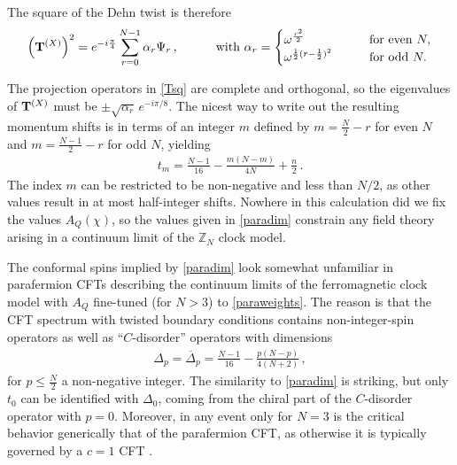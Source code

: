 The square of the Dehn twist is therefore
\begin{align} 
\Big({\mathbf{T}}^{(X)}\Big)^2 = e^{-i\frac\pi4} \sum_{r=0}^{N-1} \alpha_r \Psi_r  \,,\qquad\quad\hbox{with }\alpha_r = 
\begin{cases}
\omega^{\frac{r^2}{2}}\qquad&\hbox{for even }N,\\
\omega^{\frac12 (r-\frac12)^2}\qquad&\hbox{for odd }N.
\end{cases}
\label{Tsq}
\end{align}

The projection operators in \eqref{Tsq} are complete and orthogonal, so the eigenvalues of ${\mathbf{T}}^{(X)}$ must be
$\pm\sqrt{\alpha_r}\,e^{-i\pi/8}$. The nicest way to write out the resulting momentum shifts is in terms of an integer $m$ defined by $m = \tfrac{N}{2}-r$ for even $N$ and $m=\tfrac{N-1}{2}-r$ for odd $N$, yielding
\begin{align}
t_m=  \frac{N-1}{16} -\frac{m(N-m)}{4N} + \frac{n}{2} \,.
\label{paradim}
\end{align}
The index $m$ can be restricted to be non-negative and less than $N/2$, as other values result in at most half-integer shifts. Nowhere in this calculation did we fix the values $A_Q(\chi)$, so the values given in \eqref{paradim} constrain any field theory arising in a continuum limit of the $\mathbb{Z}_N$ clock model.

The conformal spins implied by \eqref{paradim} look somewhat unfamiliar in parafermion CFTs describing the continuum limits of the ferromagnetic clock model with $A_Q$ fine-tuned (for $N>3$) to \eqref{paraweights}. The reason is that the CFT spectrum with twisted boundary conditions contains non-integer-spin operators as well as  ``$C$-disorder'' operators  \cite{Zamolodchikov86} with dimensions
\begin{align}
\Delta_p = \overline{\Delta}_p = \frac{N-1}{16} -\frac{p(N-p)}{4(N+2)} \,,
\end{align}
for $p\le \tfrac{N}{2}$ a non-negative integer. The similarity to \eqref{paradim} is striking, but only $t_0$ can be identified with $\Delta_0$, coming from the chiral part of the $C$-disorder operator with $p=0$. Moreover, in any event only for $N=3$ is the critical behavior generically that of the parafermion CFT, as otherwise it is typically governed by a $c=1$ CFT \cite{Nienhuis1984}. 

